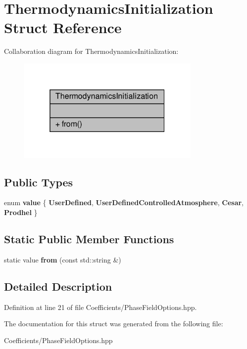 \hypertarget{structThermodynamicsInitialization}{}\section{Thermodynamics\+Initialization Struct Reference}
\label{structThermodynamicsInitialization}


Collaboration diagram for Thermodynamics\+Initialization\+:\nopagebreak
\begin{figure}[H]
\begin{center}
\leavevmode
\includegraphics[width=253pt]{structThermodynamicsInitialization__coll__graph}
\end{center}
\end{figure}
\subsection*{Public Types}
\begin{DoxyCompactItemize}
\item 
\mbox{\label{structThermodynamicsInitialization_a6be0edbd55f7c3db12adcb4e34d8f12d}} 
enum {\bfseries value} \{ {\bfseries User\+Defined}, 
{\bfseries User\+Defined\+Controlled\+Atmosphere}, 
{\bfseries Cesar}, 
{\bfseries Prodhel}
 \}
\end{DoxyCompactItemize}
\subsection*{Static Public Member Functions}
\begin{DoxyCompactItemize}
\item 
\mbox{\label{structThermodynamicsInitialization_a9fe25f5f23049d832f97641b97377ad6}} 
static value {\bfseries from} (const std\+::string \&)
\end{DoxyCompactItemize}


\subsection{Detailed Description}


Definition at line 21 of file Coefficients/\+Phase\+Field\+Options.\+hpp.



The documentation for this struct was generated from the following file\+:\begin{DoxyCompactItemize}
\item 
Coefficients/\+Phase\+Field\+Options.\+hpp\end{DoxyCompactItemize}
